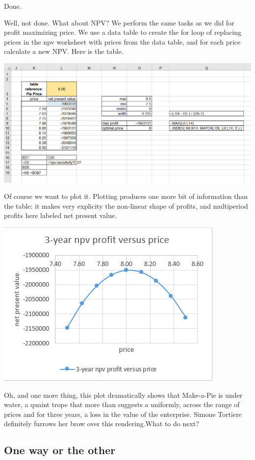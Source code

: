 \documentclass[
]{book}
\begin{document}
Done.

Well, not done. What about NPV? We perform the same tasks as we did for profit maximizing price. We use a data table to create the for loop of replacing prices in the npv worksheet with prices from the data table, and for each price calculate a new NPV. Here is the table.

\includegraphics{images/02/pie-sensitivity-npv-result.jpg}

Of course we want to plot it. Plotting produces one more bit of information than the table: it makes very explicity the non-linear shape of profits, and multiperiod profits here labeled net present value.

\includegraphics{images/02/pie-dashboard-npv-plot.jpg}

Oh, and one more thing, this plot dramatically shows that Make-a-Pie is under water, a quaint trope that more than suggests a uniformly, across the range of prices and for three years, a loss in the value of the enterprise. Simone Tortiere definitely furrows her brow over this rendering.What to do next?

\hypertarget{one-way-or-the-other}{%
\subsection{One way or the other}\label{one-way-or-the-other}}
\end{document}
